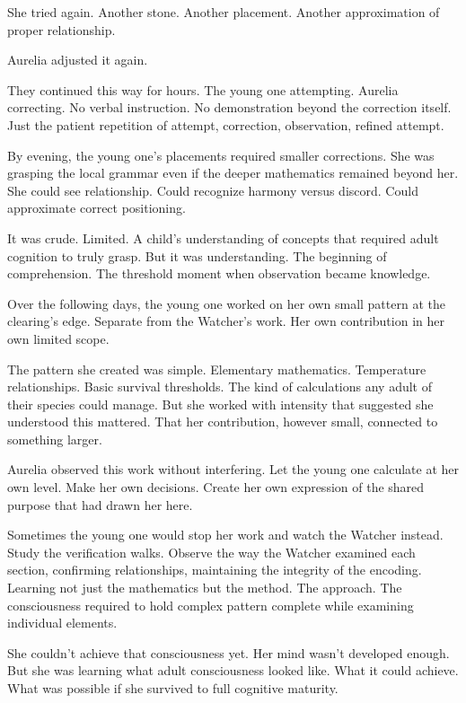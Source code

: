 She tried again. Another stone. Another placement. Another approximation of proper relationship.

Aurelia adjusted it again.

They continued this way for hours. The young one attempting. Aurelia correcting. No verbal instruction. No demonstration beyond the correction itself. Just the patient repetition of attempt, correction, observation, refined attempt.

By evening, the young one's placements required smaller corrections. She was grasping the local grammar even if the deeper mathematics remained beyond her. She could see relationship. Could recognize harmony versus discord. Could approximate correct positioning.

It was crude. Limited. A child's understanding of concepts that required adult cognition to truly grasp. But it was understanding. The beginning of comprehension. The threshold moment when observation became knowledge.

\scenebreak

Over the following days, the young one worked on her own small pattern at the clearing's edge. Separate from the Watcher's work. Her own contribution in her own limited scope.

The pattern she created was simple. Elementary mathematics. Temperature relationships. Basic survival thresholds. The kind of calculations any adult of their species could manage. But she worked with intensity that suggested she understood this mattered. That her contribution, however small, connected to something larger.

Aurelia observed this work without interfering. Let the young one calculate at her own level. Make her own decisions. Create her own expression of the shared purpose that had drawn her here.

Sometimes the young one would stop her work and watch the Watcher instead. Study the verification walks. Observe the way the Watcher examined each section, confirming relationships, maintaining the integrity of the encoding. Learning not just the mathematics but the method. The approach. The consciousness required to hold complex pattern complete while examining individual elements.

She couldn't achieve that consciousness yet. Her mind wasn't developed enough. But she was learning what adult consciousness looked like. What it could achieve. What was possible if she survived to full cognitive maturity.

